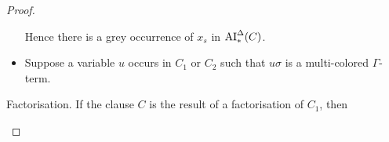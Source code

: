 \documentclass[,%
	draft=false,%
	numbers=noendperiod
	11pt,
	a4paper,
	oneside,%
	openany,
]{memoir}
\begin{document}
\begin{proof}
\begin{description}
\begin{itemize}
					Hence there is a grey occurrence of $x_s$ in $\operatorname{AI}_\mathrm{*}^\Delta(C)$.


					\begin{comment}

						Hence if there is a grey occurrence of $u$, we are done, so suppose $u$ only occurs colored in $C_1$.

						As $\sigma$ is the result of the $\mgu$ algorithm as defined in \ref{def:mgu_algo},
						there must be an occurrence of $u$ in the resolved literal, say w.l.o.g.\ at $l\at{\bhat u}$,
						such that $l'\at{\bhat u}$ is an abstraction of $u\sigma$ which is different from $u$ and as $l\sigma = l'\sigma$, $l'\at{\bhat u}$ is contained in a $\Gamma$-colored term.
						\begin{itemize}
							\item Suppose that $l'\at{\bhat u}$ contains the outermost symbol of $s$.
								Then it is a $\Delta$-term contained in a $\Gamma$-term, so by the induction hypothesis, 
								$x_? \apath_{G_{C_1}} r$, where $r$ is the maximal colored term containing $l'\at{\bhat u}$.
								\mytodo{}

							\item Otherwise $l'\at{\bhat u}$ contains a variable $v$ such that $v\sigma$ contains $s$.

								same circumstances as $u$, only finitely often


						\end{itemize}

					\end{comment}

				\item Suppose a variable $u$ occurs in $C_1$ or $C_2$ such that $u\sigma$ is a multi-colored $\Gamma$-term.
					
			\end{itemize}


		\item{}Factorisation.
			If the clause $C$ is the result of a factorisation of $C_1$, then 
			\mytodo{}
			\qedhere
	\end{description}


\end{proof}
\end{document}
